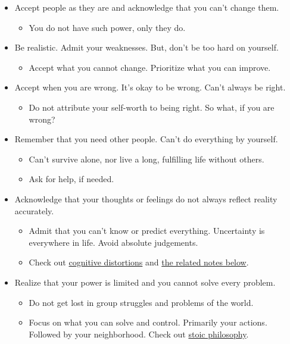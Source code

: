 \documentclass[
]{book}
\providecommand{\tightlist}{%
  \setlength{\itemsep}{0pt}\setlength{\parskip}{0pt}}
\begin{document}
\begin{itemize}
\tightlist
\item
  Accept people as they are and acknowledge that you can't change them.

  \begin{itemize}
  \tightlist
  \item
    You do not have such power, only they do.
  \end{itemize}
\item
  Be realistic. Admit your weaknesses. But, don't be too hard on yourself.

  \begin{itemize}
  \tightlist
  \item
    Accept what you cannot change. Prioritize what you can improve.
  \end{itemize}
\item
  Accept when you are wrong. It's okay to be wrong. Can't always be right.

  \begin{itemize}
  \tightlist
  \item
    Do not attribute your self-worth to being right. So what, if you are wrong?
  \end{itemize}
\item
  Remember that you need other people. Can't do everything by yourself.

  \begin{itemize}
  \tightlist
  \item
    Can't survive alone, nor live a long, fulfilling life without others.
  \item
    Ask for help, if needed.
  \end{itemize}
\item
  Acknowledge that your thoughts or feelings do not always reflect reality accurately.

  \begin{itemize}
  \tightlist
  \item
    Admit that you can't know or predict everything. Uncertainty is everywhere in life. Avoid absolute judgements.
  \item
    Check out \href{https://en.wikipedia.org/wiki/Cognitive_distortion}{cognitive distortions} and \protect\hyperlink{cognitive-distortions}{the related notes below}.
  \end{itemize}
\item
  Realize that your power is limited and you cannot solve every problem.

  \begin{itemize}
  \tightlist
  \item
    Do not get lost in group struggles and problems of the world.
  \item
    Focus on what you can solve and control. Primarily your actions. Followed by your neighborhood. Check out \href{https://en.wikipedia.org/wiki/Stoicism}{stoic philosophy}.
  \end{itemize}
\end{itemize}
\end{document}
